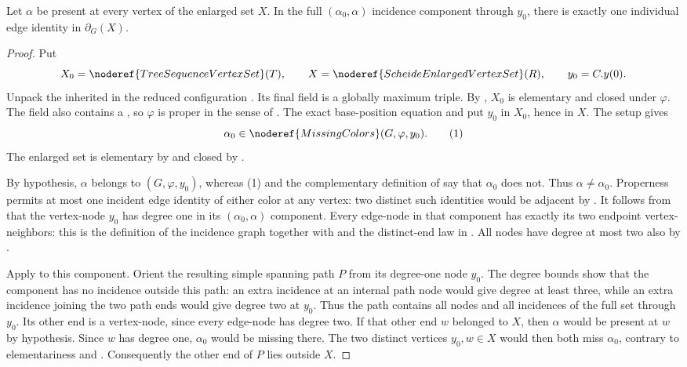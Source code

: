 \begin{lemma}
Let $\alpha$ be present at every vertex of the enlarged set $X$.  In the
full $(\alpha_0,\alpha)$ incidence component through $y_0$, there is exactly
one individual edge identity in $\partial_G(X)$.
\end{lemma}
\begin{proof}
Put
\[
 X_0=\noderef{TreeSequenceVertexSet}(T),\qquad
 X=\noderef{ScheideEnlargedVertexSet}(R),\qquad
 y_0=C.y(0).
\]
Unpack the inherited  in the
reduced configuration .  Its final
field is a globally maximum triple.  By
, $X_0$ is elementary and closed under
$\varphi$.  The  field also contains a
, so $\varphi$ is proper in the sense of
.  The exact base-position equation and
 put $y_0$ in $X_0$, hence in $X$.
The setup  gives
\[
 \alpha_0\in\noderef{MissingColors}(G,\varphi,y_0).          \tag{1}
\]
The enlarged set is elementary by 
and closed by .

By hypothesis, $\alpha$ belongs to
$(G,\varphi,y_0)$, whereas (1) and the complementary
definition of  say that $\alpha_0$ does not.
Thus $\alpha\ne\alpha_0$.  Properness permits at most one incident edge
identity of either color at any vertex: two distinct such identities
would be adjacent by .  It follows from
 that the vertex-node $y_0$ has degree
one in its $(\alpha_0,\alpha)$ component.  Every edge-node in that
component has exactly its two endpoint vertex-neighbors: this is the
definition of the incidence graph together with  and
the distinct-end law in .  All nodes have
degree at most two also by .

Apply  to this component.  Orient
the resulting simple spanning path $P$ from its degree-one node $y_0$.
The degree bounds show that the component has no incidence outside this
path: an extra incidence at an internal path node would give degree at
least three, while an extra incidence joining the two path ends would
give degree two at $y_0$.  Thus the path contains all nodes and all
incidences of the full set  through $y_0$.
Its other end is a vertex-node, since every edge-node has degree two.
If that other end $w$ belonged to $X$, then $\alpha$ would be present at
$w$ by hypothesis.  Since $w$ has degree one, $\alpha_0$ would be missing
there.  The two distinct vertices $y_0,w\in X$ would then both miss
$\alpha_0$, contrary to elementariness and
.  Consequently the other end of
$P$ lies outside $X$.


\end{proof}
